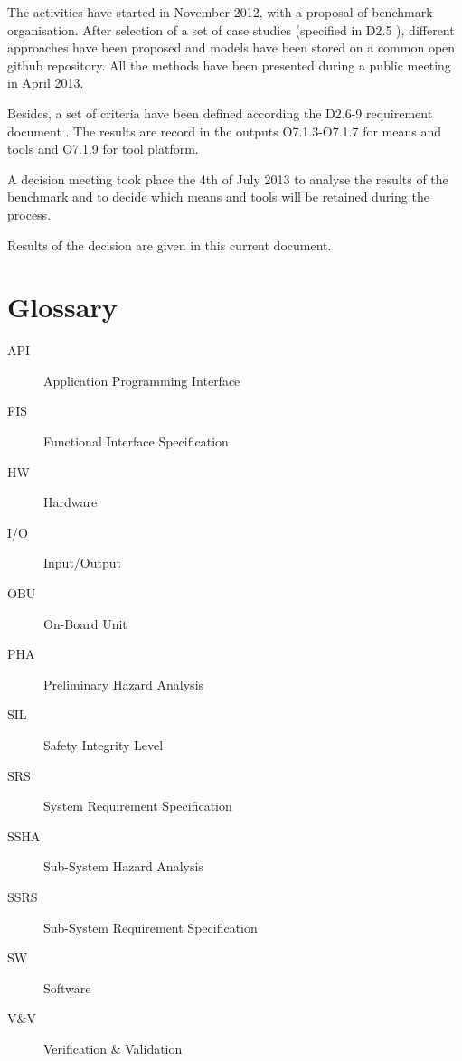 The activities have started in November 2012, with a proposal of benchmark organisation.
After selection of a set of case studies (specified in D2.5 \citep{D2_5}), different approaches have been proposed and models have been stored on a common open github repository.
All the methods have been presented during a public meeting in April 2013.

Besides,  a set of criteria have been defined according the D2.6-9 requirement document \citep{D2_6}.  The results are record in the outputs O7.1.3-O7.1.7 \citep{WP7_O713_O717} for means and tools and O7.1.9 \citep{WP7_O719} for tool platform.

A decision meeting took place the 4th of July 2013 to analyse the results of the benchmark and to decide which means and tools will be retained during the process.

Results of the decision are given in this current document. 




\section{Glossary}
\label{sec:glossary}

\begin{description}
\item[API] Application Programming Interface
\item[FIS] Functional Interface Specification
\item[HW] Hardware
\item[I/O] Input/Output
\item[OBU] On-Board Unit
\item[PHA] Preliminary Hazard Analysis
\item[SIL] Safety Integrity Level
\item[SRS] System Requirement Specification
\item[SSHA] Sub-System Hazard Analysis
\item[SSRS] Sub-System Requirement Specification
\item[SW] Software
\item[V\&V] Verification \& Validation
\end{description}



